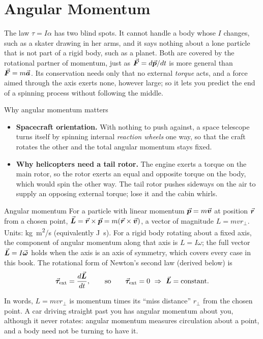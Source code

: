 \section{Angular Momentum}\label{sec:angmom14}

The law $\tau=I\alpha$ has two blind spots. It cannot handle a body whose $I$ changes, such as a skater
drawing in her arms, and it says nothing about a lone particle that is not part of a rigid body, such as a
planet. Both are covered by the rotational partner of momentum, just as $\vec{\bm{F}}=d\vec{\bm{p}}/dt$ is more general than
$\vec{\bm{F}}=m\vec{\bm{a}}$. Its conservation needs only that no external \emph{torque} acts, and a force aimed through the
axis exerts none, however large; so it lets you predict the end of a spinning process without following
the middle.

\begin{motivbox}{Why angular momentum matters}
\begin{itemize}
\item \textbf{Spacecraft orientation.} With nothing to push against, a space telescope turns itself
by spinning internal \emph{reaction wheels} one way, so that the craft rotates the other and the total
angular momentum stays fixed.
\item \textbf{Why helicopters need a tail rotor.} The engine exerts a torque on the main rotor, so the
rotor exerts an equal and opposite torque on the body, which would spin the other way. The tail rotor
pushes sideways on the air to supply an opposing external torque; lose it and the cabin whirls.
\end{itemize}
\end{motivbox}

\begin{defbox}{Angular momentum}
For a particle with linear momentum $\vec{\bm{p}}=m\vec{\bm{v}}$ at position $\vec{\bm{r}}$ from a chosen point,
$\vec{\bm{L}}=\vec{\bm{r}}\times\vec{\bm{p}}=m(\vec{\bm{r}}\times\vec{\bm{v}})$, a vector of magnitude $L=mvr_\perp$. Units: \si{kg.m^2/s} (equivalently
\si{J.s}). For a rigid body rotating about a
fixed axis, the component of angular momentum along that axis is $L=I\omega$; the full vector $\vec{\bm{L}}=I\vec{\bm{\omega}}$
holds when the axis is an axis of symmetry, which covers every case in this book. The rotational form of
Newton's second law (derived below) is
\[
\vec{\bm{\tau}}_{\text{ext}}=\frac{d\vec{\bm{L}}}{dt},\qquad\text{so}\qquad \vec{\bm{\tau}}_{\text{ext}}=0\ \Rightarrow\ \vec{\bm{L}}=\text{constant}.
\]
\end{defbox}

In words, $L=mvr_\perp$ is momentum times its ``miss distance'' $r_\perp$ from the chosen point. A car
driving straight past you has angular momentum about you, although it never rotates: angular momentum
measures circulation about a point, and a body need not be turning to have it.

